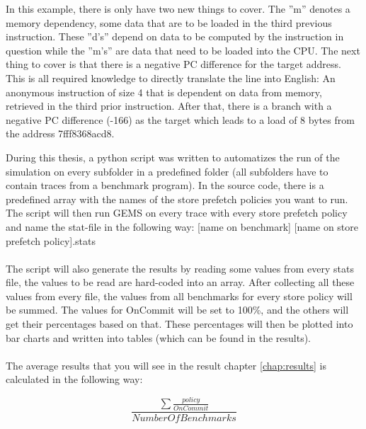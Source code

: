  In this example, there is only have two new things to cover. The ”m” denotes a
memory dependency, some data that are to be loaded in the third previous instruction.
These ”d’s” depend on data to be computed by the instruction in question while the
”m’s” are data that need to be loaded into the CPU. The next thing to cover is that
there is a negative PC difference for the target address. This is all required knowledge
to directly translate the line into English: An anonymous instruction of size 4 that is dependent on
data from memory, retrieved in the third prior instruction. After that, there
is a branch with a negative PC difference (-166) as the target which leads to a load
of 8 bytes from the address 7fff8368acd8.

During this thesis, a python script was written to automatizes the run of the simulation
on every subfolder in a predefined folder (all subfolders have to contain traces
from a benchmark program). In the source code, there is a predefined array with the
 names of the store prefetch policies you want to run. The script will then run GEMS
on every trace with every store prefetch policy and name the stat-file in the following
way: [name on benchmark] [name on store prefetch policy].stats
 \\ \\
The script will also generate the results by reading some values from every stats file,
the values to be read are hard-coded into an array. After collecting all these
values from every file, the values from all benchmarks for every store policy will be
summed. The values for OnCommit will be set to 100\%, and the others will get their
percentages based on that. These percentages will then be plotted into bar charts and written into tables (which
can be found in the results).
\\\\
The average results that you will see in the result chapter \ref{chap:results} is calculated in the following way:

$$\frac{\sum \frac{policy}{OnCommit}}{NumberOfBenchmarks}$$ 

